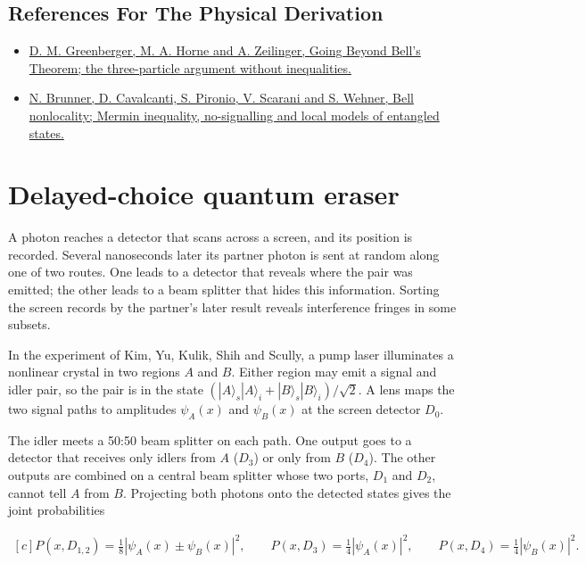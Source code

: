 \documentclass[11pt,oneside]{book}
\newenvironment{centeredalign}{\[\begin{gathered}[c]}{\end{gathered}\]}
\begin{document}
\subsection*{References For The Physical Derivation}
\begin{itemize}
\item \href{https://arxiv.org/abs/0712.0921}{D. M. Greenberger, M. A. Horne and A. Zeilinger, Going Beyond Bell's Theorem; the three-particle argument without inequalities.}
\item \href{https://arxiv.org/abs/1303.2849}{N. Brunner, D. Cavalcanti, S. Pironio, V. Scarani and S. Wehner, Bell nonlocality; Mermin inequality, no-signalling and local models of entangled states.}
\end{itemize}





\clearpage

\section{Delayed-choice quantum eraser}

\label{topic:delayed-choice-quantum-eraser}

A photon reaches a detector that scans across a screen, and its position is recorded. Several nanoseconds later its partner photon is sent at random along one of two routes. One leads to a detector that reveals where the pair was emitted; the other leads to a beam splitter that hides this information. Sorting the screen records by the partner's later result reveals interference fringes in some subsets.

In the experiment of Kim, Yu, Kulik, Shih and Scully, a pump laser illuminates a nonlinear crystal in two regions \(A\) and \(B\). Either region may emit a signal and idler pair, so the pair is in the state \((|A\rangle_s|A\rangle_i+|B\rangle_s|B\rangle_i)/\sqrt2\). A lens maps the two signal paths to amplitudes \(\psi_A(x)\) and \(\psi_B(x)\) at the screen detector \(D_0\).

The idler meets a 50:50 beam splitter on each path. One output goes to a detector that receives only idlers from \(A\) (\(D_3\)) or only from \(B\) (\(D_4\)). The other outputs are combined on a central beam splitter whose two ports, \(D_1\) and \(D_2\), cannot tell \(A\) from \(B\). Projecting both photons onto the detected states gives the joint probabilities

\begin{centeredalign}
P(x,D_{1,2})=\tfrac18|\psi_A(x)\pm\psi_B(x)|^2,\qquad
P(x,D_3)=\tfrac14|\psi_A(x)|^2,\qquad P(x,D_4)=\tfrac14|\psi_B(x)|^2.
\end{centeredalign}
\end{document}
